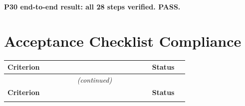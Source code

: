 \documentclass[12pt, a4paper]{article}
\begin{document}
\textbf{P30 end-to-end result: all 28 steps verified. \textcolor{passgre}{PASS}.}

\section{Acceptance Checklist Compliance}

\begin{center}
\begin{longtable}{p{0.60\linewidth} p{0.12\linewidth}}
\toprule
\textbf{Criterion} & \textbf{Status} \\
\midrule
\endfirsthead
\multicolumn{2}{c}{\small\textit{(continued)}} \\
\toprule
\textbf{Criterion} & \textbf{Status} \\
\midrule
\endhead
\bottomrule
\endlastfoot


\end{longtable}
\end{center}
\end{document}
